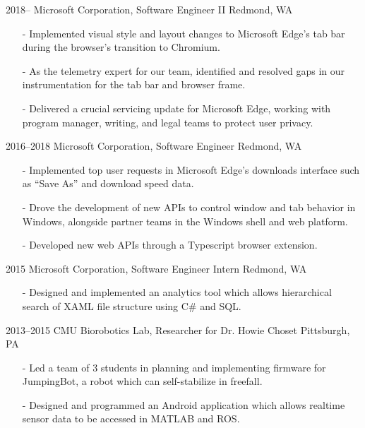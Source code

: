 \documentclass[print]{template/friggeri-cv}
\begin{document}
    \begin{entrylist}
        \entrys
            {2018--}
            {Microsoft Corporation, {\normalfont Software Engineer II}}
            {Redmond, WA}
            {\begin{itemize}[leftmargin=*]
                \item[-] Implemented visual style and layout changes to Microsoft Edge's tab bar during the browser's transition to Chromium.
                \item[-] As the telemetry expert for our team, identified and resolved gaps in our instrumentation for the tab bar and browser frame.
                \item[-] Delivered a crucial servicing update for Microsoft Edge, working with program manager, writing, and legal teams to protect user privacy.
             \end{itemize}}
        \entrys
            {2016--2018}
            {Microsoft Corporation, {\normalfont Software Engineer}}
            {Redmond, WA}
            {\begin{itemize}[leftmargin=*]
                \item[-] Implemented top user requests in Microsoft Edge's downloads interface such as ``Save As'' and download speed data.
                \item[-] Drove the development of new APIs to control window and tab behavior in Windows, alongside partner teams in the Windows shell and web platform.
                \item[-] Developed new web APIs through a Typescript browser extension.
             \end{itemize}}
        \entrys
            {2015}
            {Microsoft Corporation, {\normalfont Software Engineer Intern}}
            {Redmond, WA}
            {\begin{itemize}[leftmargin=*]
                \item[-] Designed and implemented an analytics tool which allows hierarchical search of XAML file structure using C\# and SQL.
             \end{itemize}}
        \entrys
            {2013--2015}
            {CMU Biorobotics Lab, {\normalfont Researcher for Dr. Howie Choset}}
            {Pittsburgh, PA}
            {\begin{itemize}[leftmargin=*]
                \item[-] Led a team of 3 students in planning and implementing firmware for JumpingBot, a robot which can self-stabilize in freefall.
                \item[-] Designed and programmed an Android application which allows realtime sensor data to be accessed in MATLAB and ROS.
            \end{itemize}}
    \end{entrylist}
\end{document}
